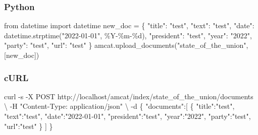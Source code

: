 \documentclass[
  letterpaper,
  DIV=11,
  numbers=noendperiod]{scrreprt}
\newenvironment{Shaded}{\begin{snugshade}}{\end{snugshade}}
\newcommand{\AttributeTok}[1]{\textcolor[rgb]{0.40,0.45,0.13}{#1}}
\newcommand{\DataTypeTok}[1]{\textcolor[rgb]{0.68,0.00,0.00}{#1}}
\newcommand{\ExtensionTok}[1]{\textcolor[rgb]{0.00,0.23,0.31}{#1}}
\newcommand{\ImportTok}[1]{\textcolor[rgb]{0.00,0.46,0.62}{#1}}
\newcommand{\NormalTok}[1]{\textcolor[rgb]{0.00,0.23,0.31}{#1}}
\newcommand{\OperatorTok}[1]{\textcolor[rgb]{0.37,0.37,0.37}{#1}}
\newcommand{\SpecialCharTok}[1]{\textcolor[rgb]{0.37,0.37,0.37}{#1}}
\newcommand{\StringTok}[1]{\textcolor[rgb]{0.13,0.47,0.30}{#1}}
\begin{document}
\subsubsection{Python}

\begin{Shaded}
\begin{Highlighting}[]
\ImportTok{from}\NormalTok{ datetime }\ImportTok{import}\NormalTok{ datetime}
\NormalTok{new\_doc }\OperatorTok{=}\NormalTok{ \{}
  \StringTok{"title"}\NormalTok{: }\StringTok{"test"}\NormalTok{,}
  \StringTok{"text"}\NormalTok{: }\StringTok{"test"}\NormalTok{,}
  \StringTok{"date"}\NormalTok{: datetime.strptime(}\StringTok{"2022{-}01{-}01"}\NormalTok{, }\StringTok{\textquotesingle{}\%Y{-}\%m{-}}\SpecialCharTok{\%d}\StringTok{\textquotesingle{}}\NormalTok{),}
  \StringTok{"president"}\NormalTok{: }\StringTok{"test"}\NormalTok{,}
  \StringTok{"year"}\NormalTok{: }\StringTok{"2022"}\NormalTok{,}
  \StringTok{"party"}\NormalTok{: }\StringTok{"test"}\NormalTok{,}
  \StringTok{"url"}\NormalTok{: }\StringTok{"test"}
\NormalTok{\}}
\NormalTok{amcat.upload\_documents(}\StringTok{"state\_of\_the\_union"}\NormalTok{, [new\_doc])}
\end{Highlighting}
\end{Shaded}

\subsubsection{cURL}

\begin{Shaded}
\begin{Highlighting}[]
\ExtensionTok{curl} \AttributeTok{{-}s} \AttributeTok{{-}X}\NormalTok{ POST http://localhost/amcat/index/state\_of\_the\_union/documents }\DataTypeTok{\textbackslash{}}
  \AttributeTok{{-}H} \StringTok{"Content{-}Type: application/json"} \DataTypeTok{\textbackslash{}}
  \AttributeTok{{-}d} \StringTok{\textquotesingle{}\{}
\StringTok{         "documents":[}
\StringTok{            \{}
\StringTok{               "title":"test",}
\StringTok{               "text":"test",}
\StringTok{               "date":"2022{-}01{-}01",}
\StringTok{               "president":"test",}
\StringTok{               "year":"2022",}
\StringTok{               "party":"test",}
\StringTok{               "url":"test"}
\StringTok{            \}}
\StringTok{         ]}
\StringTok{      \}\textquotesingle{}}
\end{Highlighting}
\end{Shaded}
\end{document}

